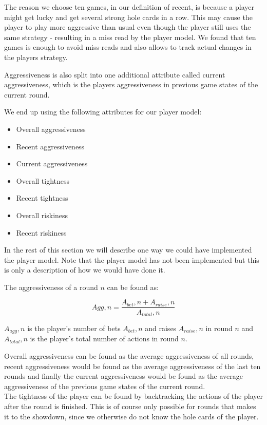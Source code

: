 The reason we choose  ten games, in our definition of recent, is because a player might get lucky and get several strong hole cards in a row. This may cause the player to play more aggressive than usual even though the player still uses the same strategy - resulting in a miss read by the player model. We found that ten games is enough to avoid miss-reads and also allows to track actual changes in the players strategy.

Aggressiveness is also split into one additional attribute called current aggressiveness, which is the players aggressiveness in previous game states of the current round.

We end up using the following attributes for our player model:
\begin{itemize}
\item Overall aggressiveness
\item Recent aggressiveness
\item Current aggressiveness
\item Overall tightness
\item Recent tightness
\item Overall riskiness
\item Recent riskiness
\end{itemize}

In the rest of this section we will describe one way we could have implemented the player model. Note that the player model has not been implemented but this is only a description of how we would have done it.

The aggressiveness of a round $n$ can be found as:

\[Agg,n = \frac{A_{bet},n + A_{raise},n}{A_{total},n}\]

$A_{agg},n$ is the player's number of bets $A_{bet},n$ and raises $A_{raise},n$ in round $n$ and  $A_{total},n$ is the player's total number of actions in round $n$. 

Overall aggressiveness can be found as the average aggressiveness of all rounds, recent aggressiveness would be found as the average aggressiveness of the last ten rounds and finally the current aggressiveness would be found as the average aggressiveness of the previous game states of the current round.\\

The tightness of the player can be found by backtracking the actions of the player after the round is finished. This is of course only possible for rounds that makes it to the showdown, since we otherwise do not know the hole cards of the player.


